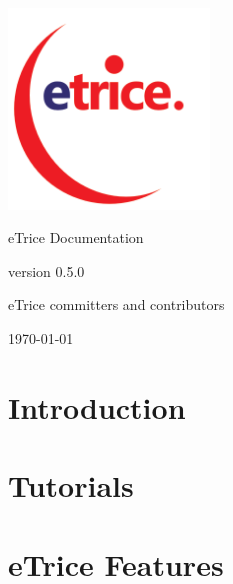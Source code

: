 \documentclass[a4paper,oneside,10pt]{book}
\newcommand{\eTrice}{{\color{blue}e}{\color{red}Trice}{}}
\begin{document}
\begin{titlepage}

\begin{center}

\includegraphics[width=0.4\textwidth]{images/logo/eTRICE-logo.png}

\Huge \eTrice{} Documentation

\Large version 0.5.0

\large \eTrice{} committers and contributors

\vfill

{\large \today}

\end{center}

\end{titlepage}

\tableofcontents

\chapter{Introduction}




\chapter{Tutorials}












\chapter{eTrice Features}





\end{document}
